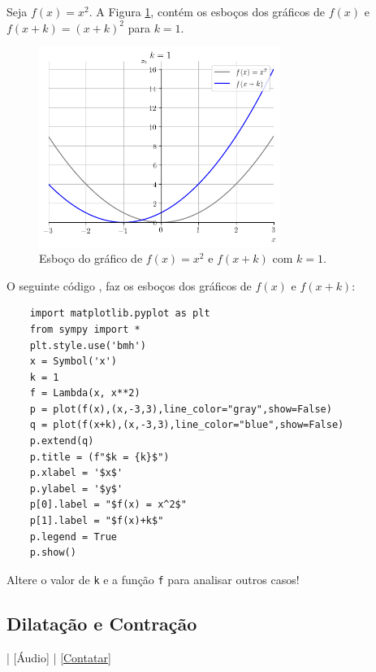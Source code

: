 \begin{ex}
  Seja $f(x) = x^2$. A Figura \ref{fig:ex_transhoriz}, contém os esboços dos gráficos de $f(x)$ e $f(x+k) = (x+k)^2$ para $k=1$.

  \begin{figure}[H]
    \centering
    \includegraphics[width=0.7\textwidth]{./cap_funcao/dados/fig_ex_transhoriz/fig_ex_transhoriz}
    \caption{Esboço do gráfico de $f(x) = x^2$ e $f(x+k)$ com $k=1$.}
    \label{fig:ex_transhoriz}
  \end{figure}

  \ifispython
  O seguinte código {\python}, faz os esboços dos gráficos de $f(x)$ e $f(x+k)$:
  \begin{lstlisting}
    import matplotlib.pyplot as plt
    from sympy import *
    plt.style.use('bmh')
    x = Symbol('x')
    k = 1
    f = Lambda(x, x**2)
    p = plot(f(x),(x,-3,3),line_color="gray",show=False)
    q = plot(f(x+k),(x,-3,3),line_color="blue",show=False)
    p.extend(q)
    p.title = (f"$k = {k}$")
    p.xlabel = '$x$'
    p.ylabel = '$y$'
    p[0].label = "$f(x) = x^2$"
    p[1].label = "$f(x)+k$"
    p.legend = True
    p.show()
  \end{lstlisting}
  Altere o valor de \verb+k+ e a função \verb+f+ para analisar outros casos!
  \fi
\end{ex}

\subsection{Dilatação e Contração}

\begin{flushright}
  [Vídeo] | [Áudio] | \href{https://phkonzen.github.io/notas/contato.html}{[Contatar]}
\end{flushright}

